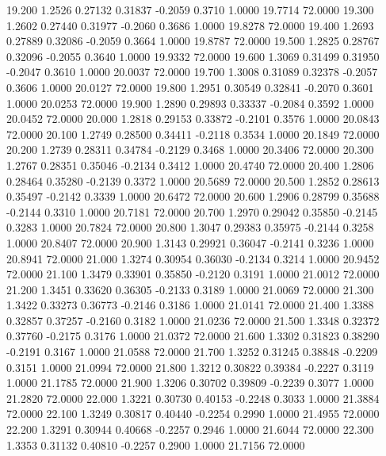   19.200   1.2526   0.27132   0.31837  -0.2059   0.3710   1.0000  19.7714  72.0000
  19.300   1.2602   0.27440   0.31977  -0.2060   0.3686   1.0000  19.8278  72.0000
  19.400   1.2693   0.27889   0.32086  -0.2059   0.3664   1.0000  19.8787  72.0000
  19.500   1.2825   0.28767   0.32096  -0.2055   0.3640   1.0000  19.9332  72.0000
  19.600   1.3069   0.31499   0.31950  -0.2047   0.3610   1.0000  20.0037  72.0000
  19.700   1.3008   0.31089   0.32378  -0.2057   0.3606   1.0000  20.0127  72.0000
  19.800   1.2951   0.30549   0.32841  -0.2070   0.3601   1.0000  20.0253  72.0000
  19.900   1.2890   0.29893   0.33337  -0.2084   0.3592   1.0000  20.0452  72.0000
  20.000   1.2818   0.29153   0.33872  -0.2101   0.3576   1.0000  20.0843  72.0000
  20.100   1.2749   0.28500   0.34411  -0.2118   0.3534   1.0000  20.1849  72.0000
  20.200   1.2739   0.28311   0.34784  -0.2129   0.3468   1.0000  20.3406  72.0000
  20.300   1.2767   0.28351   0.35046  -0.2134   0.3412   1.0000  20.4740  72.0000
  20.400   1.2806   0.28464   0.35280  -0.2139   0.3372   1.0000  20.5689  72.0000
  20.500   1.2852   0.28613   0.35497  -0.2142   0.3339   1.0000  20.6472  72.0000
  20.600   1.2906   0.28799   0.35688  -0.2144   0.3310   1.0000  20.7181  72.0000
  20.700   1.2970   0.29042   0.35850  -0.2145   0.3283   1.0000  20.7824  72.0000
  20.800   1.3047   0.29383   0.35975  -0.2144   0.3258   1.0000  20.8407  72.0000
  20.900   1.3143   0.29921   0.36047  -0.2141   0.3236   1.0000  20.8941  72.0000
  21.000   1.3274   0.30954   0.36030  -0.2134   0.3214   1.0000  20.9452  72.0000
  21.100   1.3479   0.33901   0.35850  -0.2120   0.3191   1.0000  21.0012  72.0000
  21.200   1.3451   0.33620   0.36305  -0.2133   0.3189   1.0000  21.0069  72.0000
  21.300   1.3422   0.33273   0.36773  -0.2146   0.3186   1.0000  21.0141  72.0000
  21.400   1.3388   0.32857   0.37257  -0.2160   0.3182   1.0000  21.0236  72.0000
  21.500   1.3348   0.32372   0.37760  -0.2175   0.3176   1.0000  21.0372  72.0000
  21.600   1.3302   0.31823   0.38290  -0.2191   0.3167   1.0000  21.0588  72.0000
  21.700   1.3252   0.31245   0.38848  -0.2209   0.3151   1.0000  21.0994  72.0000
  21.800   1.3212   0.30822   0.39384  -0.2227   0.3119   1.0000  21.1785  72.0000
  21.900   1.3206   0.30702   0.39809  -0.2239   0.3077   1.0000  21.2820  72.0000
  22.000   1.3221   0.30730   0.40153  -0.2248   0.3033   1.0000  21.3884  72.0000
  22.100   1.3249   0.30817   0.40440  -0.2254   0.2990   1.0000  21.4955  72.0000
  22.200   1.3291   0.30944   0.40668  -0.2257   0.2946   1.0000  21.6044  72.0000
  22.300   1.3353   0.31132   0.40810  -0.2257   0.2900   1.0000  21.7156  72.0000
